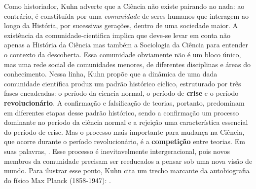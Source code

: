 \documentclass[./main.tex]{subfiles}
\begin{document}
\par Como historiador, Kuhn adverte que a Ciência não existe pairando no nada: ao contrário, é constituída por uma \textit{comunidade} de seres humanos que interagem ao longo da História, por sucessivas gerações, dentro de uma sociedade maior. A existência da \gls{comunidade-cientifica} implica que deve-se levar em conta não apenas a História da Ciência mas também a Sociologia da Ciência para entender o contexto da descoberta. Essa comunidade obviamente não é um bloco único, mas uma rede social de comunidades menores, de diferentes disciplinas e áreas do conhecimento. Nessa linha, Kuhn propõe que a dinâmica de uma dada comunidade científica produz um padrão histórico cíclico, estruturado por três fases encadeadas: o período da \gls{ciencia-normal}, o período de \textbf{crise} e o período \textbf{revolucionário}. A confirmação e falsificação de teorias, portanto, predominam em diferentes etapas desse padrão histórico, sendo a confirmação um processo dominante no período da ciência normal e a rejeição uma característica essencial do período de crise. Mas o processo mais importante para mudança na Ciência, que ocorre durante o período revolucionário, é a \textbf{competição} entre teorias. Em suas palavras, . Esse processo é inevitavelmente intergeracional, pois novos membros da comunidade precisam ser reeducados a pensar sob uma nova visão de mundo. Para ilustrar esse ponto, Kuhn cita um trecho marcante da autobiografia do físico Max Planck (1858-1947): .
\end{document}
